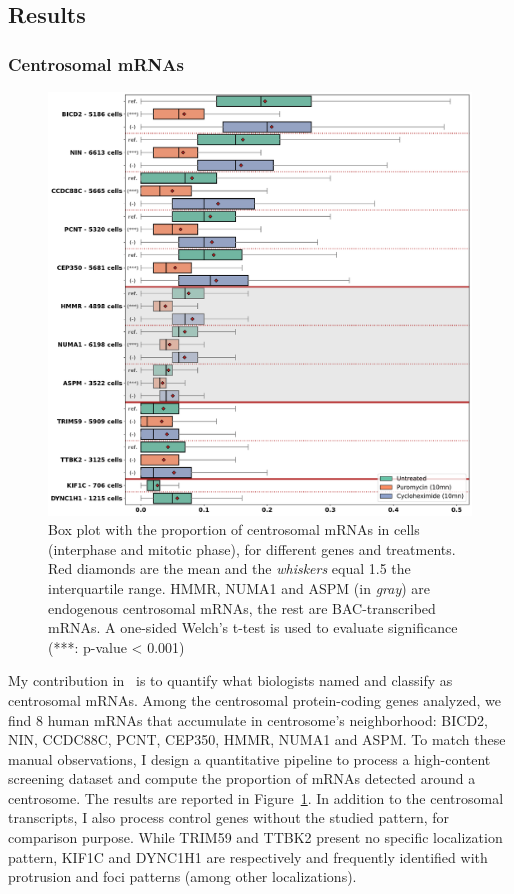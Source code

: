 \subsection{Results}
\label{subsec:results_centrosomal}

\subsubsection{Centrosomal mRNAs}

\begin{figure}[]
    \centering
    \includegraphics[width=\textwidth]{figures/chapter5/plot_rna_centrosome}
    \caption{Box plot with the proportion of centrosomal mRNAs in cells (interphase and mitotic phase), for different genes and treatments.
	Red diamonds are the mean and the \textit{whiskers} equal 1.5 the interquartile range.
	HMMR, NUMA1 and ASPM (in \textit{gray}) are endogenous centrosomal mRNAs, the rest are BAC-transcribed mRNAs.
	A one-sided Welch’s t-test is used to evaluate significance (***: p-value < 0.001)}
    \label{fig:plot_rna_centrosome}
\end{figure}

My contribution in~\cite{safieddine_choreography_2021} is to quantify what biologists named and classify as centrosomal \ac{mRNA}s.
Among the centrosomal protein-coding genes analyzed, we find 8 human \ac{mRNA}s that accumulate in centrosome's neighborhood: BICD2, NIN, CCDC88C, PCNT, CEP350, HMMR, NUMA1 and ASPM.
To match these manual observations, I design a quantitative pipeline to process a high-content screening dataset and compute the proportion of \ac{mRNA}s detected around a centrosome.
The results are reported in Figure~\ref{fig:plot_rna_centrosome}.
In addition to the centrosomal transcripts, I also process control genes without the studied pattern, for comparison purpose.
While TRIM59 and TTBK2 present no specific localization pattern, KIF1C and DYNC1H1 are respectively and frequently identified with protrusion and foci patterns (among other localizations).

